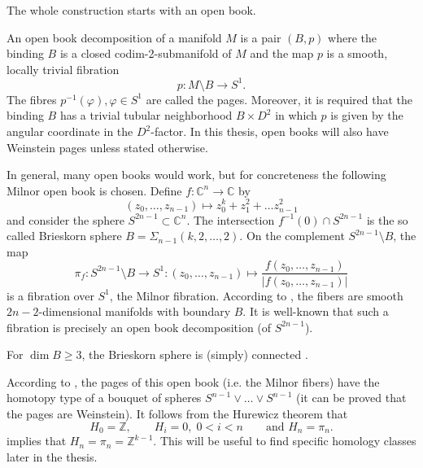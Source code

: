 The whole construction starts with an open book.

\begin{definition}\label{def:open_book_1}
    An open book decomposition of a manifold $M$ is a pair $(B,p)$ where the binding $B$ is a closed codim-2-submanifold of $M$ and the map $p$ is a smooth, locally trivial fibration
    \[
        p: M\setminus B \to S^1.
    \]
    The fibres $p^{-1}(\varphi), \varphi \in S^1$ are called the pages.
    Moreover, it is required that the binding $B$ has a trivial tubular neighborhood $B\times D^2$ in which $p$ is given by the angular coordinate in the $D^2$-factor.
    In this thesis, open books will also have Weinstein pages unless stated otherwise.
\end{definition}

In general, many open books would work, but for concreteness the following Milnor open book is chosen.
Define $f\colon \mathbb C^n \to \mathbb C$ by
\[
    (z_0, \dots, z_{n-1}) \mapsto z_0^k + z_1^2 + \dots z_{n-1}^2
\]
and consider the sphere $S^{2n-1} \subset \mathbb C^n$.
The intersection $f^{-1}(0) \cap S^{2n-1}$ is the so called Brieskorn sphere $B = \Sigma_{n-1}(k,2,\dots,2)$.
On the complement $S^{2n-1} \setminus B$, the map
\[
    \pi_f\colon S^{2n-1}\setminus B \to S^1\colon (z_0, \dots, z_{n-1}) \mapsto \frac{f(z_0, \dots, z_{n-1})}{|f(z_0, \dots, z_{n-1})|}
\]
is a fibration over $S^1$, the Milnor fibration.
According to \cite[Lemma 6.1]{Milnor69}, the fibers are smooth $2n-2$-dimensional manifolds with boundary $B$.
It is well-known that such a fibration is precisely an open book decomposition (of $S^{2n-1}$).

For $\dim B \geq 3$, the Brieskorn sphere is (simply) connected \cite[Lemma 2]{Brieskorn66}.

According to \cite[Thm 6.5]{Milnor69}, the pages of this open book (i.e. the Milnor fibers) have the homotopy type of a bouquet of spheres 
$S^{n-1} \vee \dots \vee S^{n-1}$ (it can be proved that the pages are Weinstein).
It follows from the Hurewicz theorem that 
\[
    H_0 = \mathbb Z, \qquad H_i = 0, \; 0 < i < n \qquad \text{and } H_n = \pi_n.
\]
\cite[Theorem 9.1]{Milnor69} implies that $H_n = \pi_n = \mathbb Z^{k-1}$.
This will be useful to find specific homology classes later in the thesis.